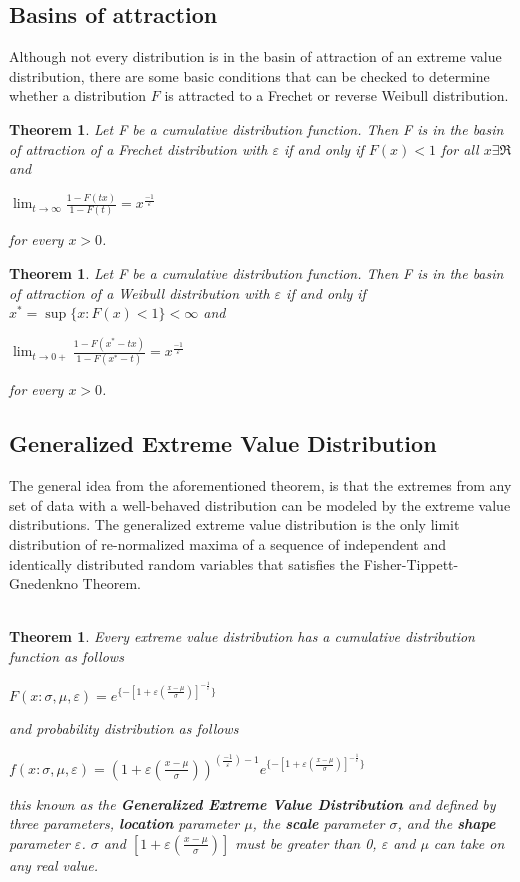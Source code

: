 \documentclass[11pt,a4paper]{article}
\theoremstyle{plain}
\newtheorem{thm}[fact]{Theorem}
\begin{document}
\subsection*{Basins of attraction}
Although not every distribution is in the basin of attraction of an extreme value distribution, there are some basic conditions that can be checked to determine whether a distribution $F$ is attracted to a Frechet or reverse Weibull distribution.  

\begin{thm} 
Let F be a cumulative distribution function. Then F is in the basin of attraction of a Frechet distribution with $\varepsilon$ if and only if $F(x)<1$ for all $x \exists \Re$ and
\begin{center}
$\lim_{t \rightarrow \infty}\frac{1-F(tx)}{1-F(t)}=x^{\frac{-1}{\varepsilon}}$
\end{center}
for every $x>0$.
\end{thm}


\begin{thm}
Let F be a cumulative distribution function. Then F is in the basin of attraction of a Weibull distribution with $\varepsilon$ if and only if $x^*=\sup\{x:F(x)<1\}<\infty$ and
\begin{center}
$\lim_{t \rightarrow 0+}\frac{1-F(x^*-tx)}{1-F(x^*-t)}=x^{\frac{-1}{\varepsilon}}$
\end{center}
for every $x>0$.
\end{thm}


\subsection{Generalized Extreme Value Distribution}
The general idea from the aforementioned theorem, is that the extremes from any set of data with a well-behaved distribution can be modeled by the extreme value distributions.  The generalized extreme value distribution is the only limit distribution of re-normalized maxima of a sequence of independent and identically distributed random variables that satisfies the Fisher-Tippett-Gnedenkno Theorem. 
\\
\\
\begin{thm}
Every extreme value distribution has a cumulative distribution function as follows 
\begin{center}
$F(x:\sigma,\mu,\varepsilon)=e^{\{-[1+\varepsilon(\frac{x-\mu}{\sigma})]^{-\frac{1}{\varepsilon}}\}}$
\end{center}
and probability distribution as follows
\begin{center}
$f(x:\sigma,\mu,\varepsilon)=(1+\varepsilon(\frac{x-\mu}{\sigma}))^{(\frac{-1}{\varepsilon})-1}e^{\{-[1+\varepsilon(\frac{x-\mu}{\sigma})]^{-\frac{1}{\varepsilon}}\}}$
\end{center}
this known as the \textbf{Generalized Extreme Value Distribution} and  defined by three parameters, \textbf{location} parameter $\mu$, the \textbf{scale} parameter $\sigma$, and the \textbf{shape} parameter $\varepsilon$. $\sigma$ and $[1+\varepsilon(\frac{x-\mu}{\sigma})]$ must be greater than 0, $\varepsilon$ and $\mu$ can take on any real value.
\\
\end{thm}
\end{document}

